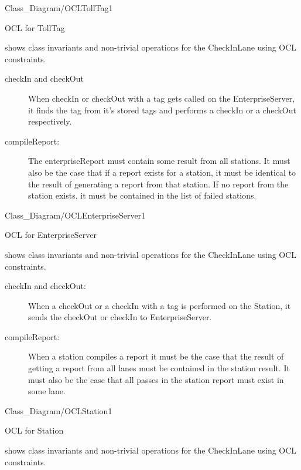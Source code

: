 \begin{myfigure}{Class_Diagram/OCLTollTag}{1}
\caption{OCL for TollTag\madeby{\kj}{\mb}}
\label{fig:OCLTollTag}
\end{myfigure}

 shows class invariants and non-trivial operations for the CheckInLane using OCL constraints.

\begin{description}
\item [checkIn and checkOut]When checkIn or checkOut with a tag gets called on the EnterpriseServer, it finds the tag from it's stored tags and performs a checkIn or a checkOut respectively.
\item [compileReport:]The enterpriseReport must contain some result from all stations. It must also be the case that if a report exists for a station, it must be identical to the result of generating a report from that station. If no report from the station exists, it must be contained in the list of failed stations.
\end{description}


\begin{myfigure}{Class_Diagram/OCLEnterpriseServer}{1}
\caption{OCL for EnterpriseServer\madeby{\af}{\mt} }
\label{fig:OCLEnterpriseServer}
\end{myfigure}


 shows class invariants and non-trivial operations for the CheckInLane using OCL constraints.

\begin{description}
\item [checkIn and checkOut:] When a checkOut or a checkIn with a tag is performed on the Station, it sends the checkOut or checkIn to EnterpriseServer.
\item [compileReport:] When a station compiles a report it must be the case that the result of getting a report from all lanes must be contained in the station result. It must also be the case that all passes in the station report must exist in some lane.
\end{description}

\begin{myfigure}{Class_Diagram/OCLStation}{1}
\caption{OCL for Station\madeby{\jb}{\mb}}
\label{fig:OCLStation}
\end{myfigure}


 shows class invariants and non-trivial operations for the CheckInLane using OCL constraints.

